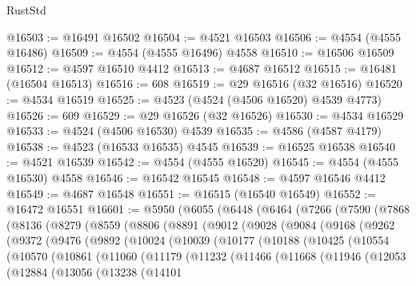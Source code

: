 \begin{lexlean}{RustStd}
\begin{coremodule}
@16503 := @16491 @16502
@16504 := @4521 @16503
@16506 := @4554 (@4555 @16486)
@16509 := @4554 (@4555 @16496) @4558
@16510 := @16506 @16509
@16512 := @4597 @16510 @4412
@16513 := @4687 @16512
@16515 := @16481 (@16504 @16513)
@16516 := 608
@16519 := @29 @16516 (@32 @16516)
@16520 := @4534 @16519
@16525 := @4523 (@4524 (@4506 @16520) @4539 @4773)
@16526 := 609
@16529 := @29 @16526 (@32 @16526)
@16530 := @4534 @16529
@16533 := @4524 (@4506 @16530) @4539
@16535 := @4586 (@4587 @4179)
@16538 := @4523 (@16533 @16535) @4545
@16539 := @16525 @16538
@16540 := @4521 @16539
@16542 := @4554 (@4555 @16520)
@16545 := @4554 (@4555 @16530) @4558
@16546 := @16542 @16545
@16548 := @4597 @16546 @4412
@16549 := @4687 @16548
@16551 := @16515 (@16540 @16549)
@16552 := @16472 @16551
@16601 := @5950
    (@6055
      (@6448
        (@6464
          (@7266
            (@7590
              (@7868
                (@8136
                  (@8279
                    (@8559
                      (@8806
                        (@8891
                          (@9012
                            (@9028
                              (@9084
                                (@9168
                                  (@9262
                                    (@9372
                                      (@9476
                                        (@9892
                                          (@10024
                                            (@10039
                                              (@10177
                                                (@10188
                                                  (@10425
                                                    (@10554
                                                      (@10570
                                                        (@10861
                                                          (@11060
                                                            (@11179
                                                              (@11232
                                                                (@11466
                                                                  (@11668
                                                                    (@11946
                                                                      (@12053
                                                                        (@12884
                                                                          (@13056
                                                                            (@13238
                                                                              (@14101

\end{coremodule}
\end{lexlean}

